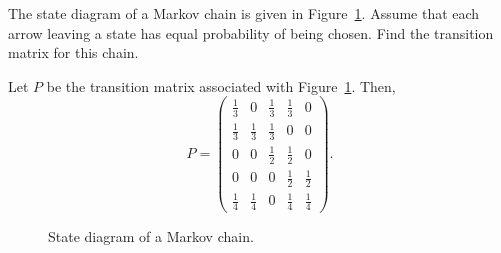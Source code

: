 \documentclass{ximera}
\begin{document}
\begin{exercise} \label{c4.10.3}
The state diagram of a Markov chain is given in Figure~\ref{F:Mchain}.
Assume that each arrow leaving a state has equal probability of being chosen.
Find the transition matrix for this chain.

\begin{solution}

Let $P$ be the transition matrix associated with Figure~\ref{F:Mchain}.
Then,
\[ P = \left(\begin{array}{rrrrr}
\frac{1}{3} & 0 & \frac{1}{3} & \frac{1}{3} & 0 \\
\frac{1}{3} & \frac{1}{3} & \frac{1}{3} & 0 & 0 \\
0 & 0 & \frac{1}{2} & \frac{1}{2} & 0 \\
0 & 0 & 0 & \frac{1}{2} & \frac{1}{2} \\
\frac{1}{4} & \frac{1}{4} & 0 & \frac{1}{4} & \frac{1}{4}
\end{array}\right). \]

\end{solution}
\end{exercise}
\begin{figure}[htb]
        \centerline{%
        }
        \caption{State diagram of a Markov chain.}
        \label{F:Mchain}
\end{figure}
\end{document}
